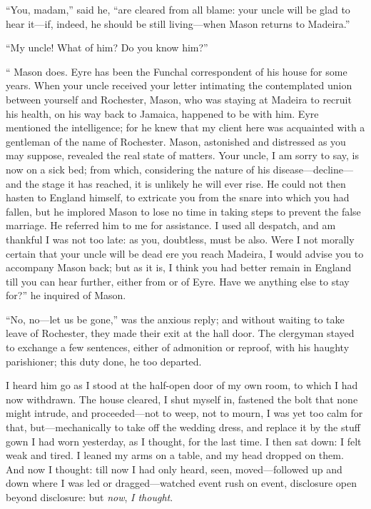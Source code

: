 \enquote{You, madam,} said he, \enquote{are cleared from all blame: your
	uncle will be glad to hear it---if, indeed, he should be still
	living---when \Mr{} Mason returns to Madeira.}

\enquote{My uncle! What of him? Do you know him?}

\enquote{\Mr{} Mason does. \Mr{} Eyre has been the Funchal correspondent of
	his house for some years. When your uncle received your letter
	intimating the contemplated union between yourself and \Mr{} Rochester,
	\Mr{} Mason, who was staying at Madeira to recruit his health, on his way
	back to Jamaica, happened to be with him. \Mr{} Eyre mentioned the
	intelligence; for he knew that my client here was acquainted with a
	gentleman of the name of Rochester. \Mr{} Mason, astonished and
	distressed as you may suppose, revealed the real state of matters. Your
	uncle, I am sorry to say, is now on a sick bed; from which, considering
	the nature of his disease---decline---and the stage it has reached, it
	is unlikely he will ever rise. He could not then hasten to England
	himself, to extricate you from the snare into which you had fallen, but
	he implored \Mr{} Mason to lose no time in taking steps to prevent the
	false marriage. He referred him to me for assistance. I used all
	despatch, and am thankful I was not too late: as you, doubtless, must be
	also. Were I not morally certain that your uncle will be dead ere you
	reach Madeira, I would advise you to accompany \Mr{} Mason back; but as it
	is, I think you had better remain in England till you can hear further,
	either from or of \Mr{} Eyre. Have we anything else to stay for?} he
inquired of \Mr{} Mason.

\enquote{No, no---let us be gone,} was the anxious reply; and without
waiting to take leave of \Mr{} Rochester, they made their exit at the hall
door. The clergyman stayed to exchange a few sentences, either of
admonition or reproof, with his haughty parishioner; this duty done, he
too departed.

I heard him go as I stood at the half-open door of my own room, to which
I had now withdrawn. The house cleared, I shut myself in, fastened the
bolt that none might intrude, and proceeded---not to weep, not to mourn,
I was yet too calm for that, but---mechanically to take off the wedding
dress, and replace it by the stuff gown I had worn yesterday, as I
thought, for the last time. I then sat down: I felt weak and tired. I
leaned my arms on a table, and my head dropped on them. And now I
thought: till now I had only heard, seen, moved---followed up and down
where I was led or dragged---watched event rush on event, disclosure
open beyond disclosure: but \emph{now}, \emph{I thought}.

